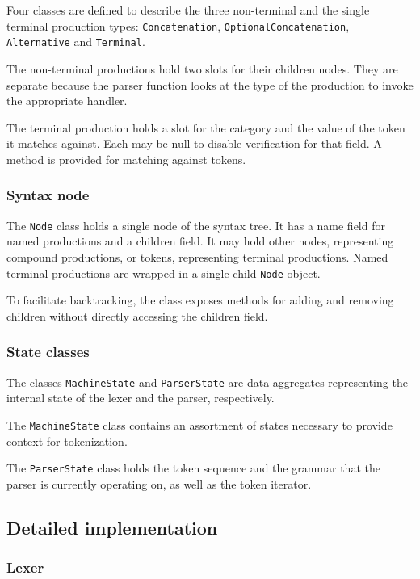 \documentclass{article}
\begin{document}
	Four classes are defined to describe the three non-terminal and the single
	terminal production types: \texttt{Concatenation},
	\texttt{OptionalConcatenation}, \texttt{Alternative} and \texttt{Terminal}.

	The non-terminal productions hold two slots for their children nodes. They
	are separate because the parser function looks at the type of the production
	to invoke the appropriate handler.

	The terminal production holds a slot for the category and the value of the
	token it matches against. Each may be null to disable verification for that
	field. A method is provided for matching against tokens.

	\subsubsection{Syntax node}

	The \texttt{Node} class holds a single node of the syntax tree. It has a
	name field for named productions and a children field. It may hold other
	nodes, representing compound productions, or tokens, representing terminal
	productions. Named terminal productions are wrapped in a single-child
	\texttt{Node} object.

	To facilitate backtracking, the class exposes methods for adding and
	removing children without directly accessing the children field.

	\subsubsection{State classes}

	The classes \texttt{MachineState} and \texttt{ParserState} are data
	aggregates representing the internal state of the lexer and the parser,
	respectively.

	The \texttt{MachineState} class contains an assortment of states necessary
	to provide context for tokenization.

	The \texttt{ParserState} class holds the token sequence and the grammar
	that the parser is currently operating on, as well as the token iterator.

	\subsection{Detailed implementation}

	\subsubsection{Lexer}
\end{document}
